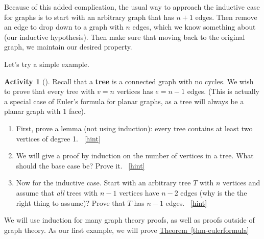 \documentclass[10pt,]{book}
\newcommand{\terminology}[1]{\textbf{#1}}
\theoremstyle{plain}
\theoremstyle{definition}
\theoremstyle{definition}
\theoremstyle{definition}
\newtheorem{activity}[project]{Activity}
\numberwithin{equation}{chapter}
\begin{document}
\par
\hypertarget{p-1487}{}%
Because of this added complication, the usual way to approach the inductive case for graphs is to start with an arbitrary graph that has \(n+1\) edges.  Then remove an edge to drop down to a graph with \(n\) edges, which we know something about (our inductive hypothesis).  Then make sure that moving back to the original graph, we maintain our desired property.%
\par
\hypertarget{p-1488}{}%
Let's try a simple example.%
\begin{activity}[]\label{activity-283}
\hypertarget{p-1489}{}%
Recall that a \terminology{tree} is a connected graph with no cycles.  We wish to prove that every tree with \(v = n\) vertices has \(e = n-1\) edges.  (This is actually a special case of Euler's formula for planar graphs, as a tree will always be a planar graph with 1 face).%
\begin{enumerate}[font=\bfseries,label=(\alph*),ref=\alph*]
\item\label{task-248} \hypertarget{p-1490}{}%
First, prove a lemma (not using induction): every tree contains at least two vertices of degree 1.%
~\hfill{\tiny\hyperlink{a-288.a}{[hint]}\hypertarget{q-288.a}{}}\item\label{task-249} \hypertarget{p-1492}{}%
We will give a proof by induction on the number of vertices in a tree.  What should the base case be?  Prove it.%
~\hfill{\tiny\hyperlink{a-288.b}{[hint]}\hypertarget{q-288.b}{}}\item\label{task-250} \hypertarget{p-1494}{}%
Now for the inductive case.  Start with an arbitrary tree \(T\) with \(n\) vertices and assume that \emph{all} trees with \(n-1\) vertices have \(n-2\) edges (why is the the right thing to assume)?  Prove that \(T\) has \(n-1\) edges.%
~\hfill{\tiny\hyperlink{a-288.c}{[hint]}\hypertarget{q-288.c}{}}\end{enumerate}
\end{activity}
\hypertarget{p-1496}{}%
We will use induction for many graph theory proofs, as well as proofs outside of graph theory.  As our first example, we will prove \hyperref[thm-eulerformula]{Theorem~\ref{thm-eulerformula}}%
\typeout{************************************************}
\typeout{************************************************}
\end{document}
